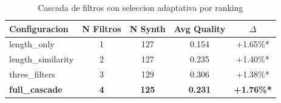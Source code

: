 
\begin{table}[h]
\centering
\caption{Cascada de filtros con seleccion adaptativa por ranking}
\label{tab:filter_cascade_v3}
\begin{tabular}{lcccc}
\hline
Configuracion & N Filtros & N Synth & Avg Quality & $\Delta$ \\
\hline
length_only & 1 & 127 & 0.154 & +1.65\%* \\
length_similarity & 2 & 127 & 0.235 & +1.40\%* \\
three_filters & 3 & 129 & 0.306 & +1.38\%* \\
\textbf{full_cascade} & \textbf{4} & \textbf{125} & \textbf{0.231} & \textbf{+1.76\%*} \\

\hline
\end{tabular}
\end{table}
